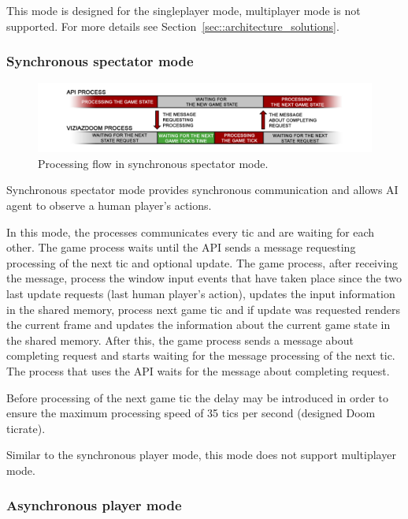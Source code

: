\documentclass[english,bachelor,a4paper,twoside]{ppfcmthesis}
\begin{document}
	    This mode is designed for the singleplayer mode, multiplayer mode is not supported. For more details see Section~\ref{sec::architecture_solutions}.

    \subsubsection{Synchronous spectator mode}\label{sec:architecture_spectator_mode}

	    \begin{figure}
			    \centering
			    \includegraphics[scale=0.24]{spectator_mode_diagram.png}
			    \caption{Processing flow in synchronous spectator mode.}\label{fig:spectator_mode_diagram}
	    \end{figure}
	    
	    Synchronous spectator mode provides synchronous communication and allows AI agent to observe a human player's actions. 
	    
	    In this mode, the processes communicates every tic and are waiting for each other. The game process waits until the API sends a message requesting processing of the next tic and optional update. The game process, after receiving the message, process the window input events that have taken place since the two last update requests (last human player's action), updates the input information in the shared memory, process next game tic and if update was requested renders the current frame and updates the information about the current game state in the shared memory. After this, the game process sends a message about completing request and starts waiting for the message processing of the next tic. The process that uses the API waits for the message about completing request.

        Before processing of the next game tic the delay may be introduced in order to ensure the maximum processing speed of 35 tics per second (designed Doom ticrate).
        
        Similar to the synchronous player mode, this mode does not support multiplayer mode.

    \subsubsection{Asynchronous player mode}\label{sec:architecture_async_player_mode}
\end{document}
